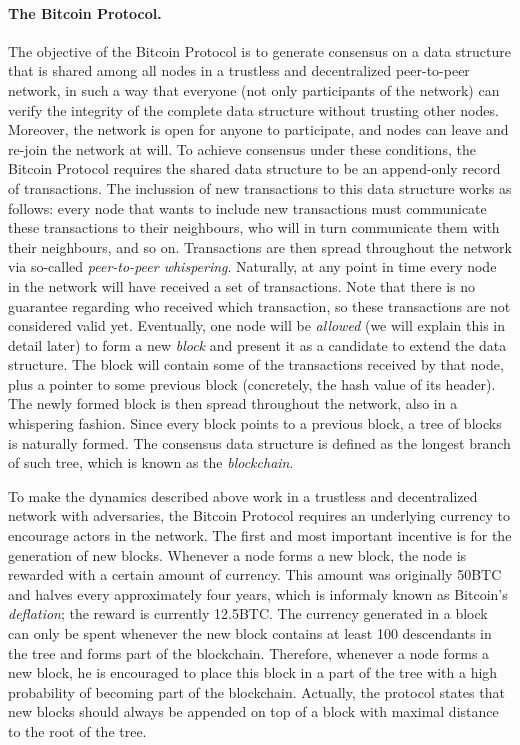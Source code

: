 \paragraph{\bf The Bitcoin Protocol.} The objective of the Bitcoin Protocol is to generate consensus on a data structure that is shared among all nodes in a trustless and decentralized peer-to-peer network, in such a way that everyone (not only participants of the network) can verify the integrity of the complete data structure without trusting other nodes. Moreover, the network is open for anyone to participate, and nodes can leave and re-join the network at will. To achieve consensus under these conditions, the Bitcoin Protocol requires the shared data structure to be an append-only record of transactions. The inclussion of new transactions to this data structure works as follows: every node that wants to include new transactions must communicate these transactions to their neighbours, who will in turn communicate them with their neighbours, and so on. Transactions are then spread throughout the network via so-called \emph{peer-to-peer whispering}. Naturally, at any point in time every node in the network will have received a set of transactions. Note that there is no guarantee regarding who received which transaction, so these transactions are not considered valid yet. Eventually, one node will be \emph{allowed} (we will explain this in detail later) to form a new \emph{block} and present it as a candidate to extend the data structure. The block will contain some of the transactions received by that node, plus a pointer to some previous block (concretely, the hash value of its header). The newly formed block is then spread throughout the network, also in a whispering fashion. Since every block points to a previous block, a tree of blocks is naturally formed. The consensus data structure is defined as the longest branch of such tree, which is known as the \emph{blockchain}.

To make the dynamics described above work in a trustless and decentralized network with adversaries, the Bitcoin Protocol requires an underlying currency to encourage actors in the network. The first and most important incentive is for the generation of new blocks. Whenever a node forms a new block, the node is rewarded with a certain amount of currency. This amount was originally 50BTC and halves every approximately four years, which is informaly known as Bitcoin's \emph{deflation}; the reward is currently 12.5BTC. The currency generated in a block can only be spent whenever the new block contains at least 100 descendants in the tree and forms part of the blockchain. Therefore, whenever a node forms a new block, he is encouraged to place this block in a part of the tree with a high probability of becoming part of the blockchain. Actually, the protocol states that new blocks should always be appended on top of a block with maximal distance to the root of the tree.


